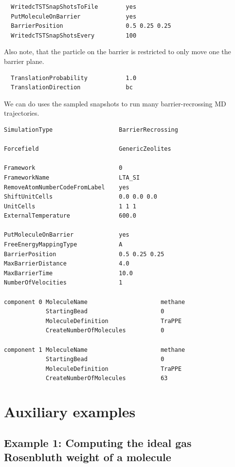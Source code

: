 \begin{small}
\begin{verbatim}
  WritedcTSTSnapShotsToFile        yes
  PutMoleculeOnBarrier             yes
  BarrierPosition                  0.5 0.25 0.25
  WritedcTSTSnapShotsEvery         100
\end{verbatim}
\end{small}
Also note, that the particle on the barrier is restricted to only move one the barrier plane.
\begin{small}
\begin{verbatim}
  TranslationProbability           1.0
  TranslationDirection             bc
\end{verbatim}
\end{small}

We can do uses the sampled snapshots to run many barrier-recrossing MD trajectories.
\begin{small}
\begin{verbatim}
SimulationType                   BarrierRecrossing
  
Forcefield                       GenericZeolites

Framework                        0
FrameworkName                    LTA_SI
RemoveAtomNumberCodeFromLabel    yes
ShiftUnitCells                   0.0 0.0 0.0
UnitCells                        1 1 1
ExternalTemperature              600.0

PutMoleculeOnBarrier             yes
FreeEnergyMappingType            A
BarrierPosition                  0.5 0.25 0.25
MaxBarrierDistance               4.0
MaxBarrierTime                   10.0
NumberOfVelocities               1

component 0 MoleculeName                     methane
            StartingBead                     0
            MoleculeDefinition               TraPPE
            CreateNumberOfMolecules          0

component 1 MoleculeName                     methane
            StartingBead                     0
            MoleculeDefinition               TraPPE
            CreateNumberOfMolecules          63
\end{verbatim}
\end{small}

\section{Auxiliary examples}

\subsection*{Example 1: Computing the ideal gas Rosenbluth weight of a molecule}

